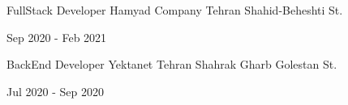 

\begin{cventries}

  \cventry
    {FullStack Developer} %
    {Hamyad Company} %
    {Tehran Shahid-Beheshti St.} %
    {} %
    {
      \begin{cvitems} %
         Sep 2020 - Feb 2021
        \end{cvitems}
    }
  \cventry
    {BackEnd Developer} %
    {Yektanet} %
    {Tehran Shahrak Gharb Golestan St.} %
    {} %
    {
      \begin{cvitems} %
        Jul 2020 - Sep 2020
        \end{cvitems}
    }
\end{cventries}

